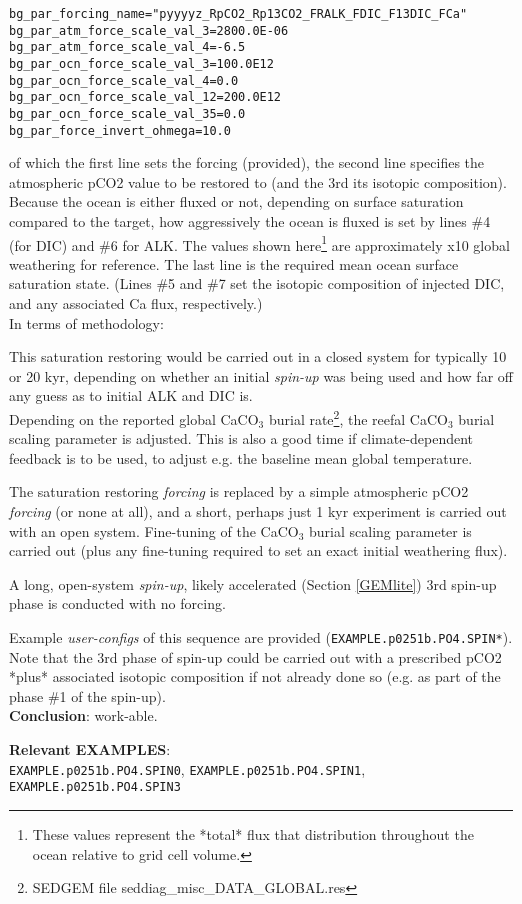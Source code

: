 \documentclass[10pt,twoside]{article}
\begin{document}
\begin{compactenum}
\begin{verbatim}
bg_par_forcing_name="pyyyyz_RpCO2_Rp13CO2_FRALK_FDIC_F13DIC_FCa"
bg_par_atm_force_scale_val_3=2800.0E-06
bg_par_atm_force_scale_val_4=-6.5
bg_par_ocn_force_scale_val_3=100.0E12
bg_par_ocn_force_scale_val_4=0.0
bg_par_ocn_force_scale_val_12=200.0E12
bg_par_ocn_force_scale_val_35=0.0
bg_par_force_invert_ohmega=10.0
\end{verbatim}\normalsize\vspace{-5pt}
of which the first line sets the forcing (provided), the second line specifies the atmospheric pCO2 value to be restored to (and the 3rd its isotopic composition). Because the ocean is either fluxed or not, depending on surface saturation compared to the target, how aggressively the ocean is fluxed is set by lines \#4 (for DIC) and \#6 for ALK. The values shown here\footnote{These values represent the *total* flux that distribution throughout the ocean relative to grid cell volume.} are approximately x10 global weathering for reference. The last line is the required mean ocean surface saturation state. (Lines \#5 and \#7 set the isotopic composition of injected DIC, and any associated Ca flux, respectively.)
\\ In terms of methodology:
\begin{compactenum}
        \item This saturation restoring would be carried out in a closed system for typically 10 or 20 kyr, depending on whether an initial \textit{spin-up} was being used and how far off any guess as to initial ALK and DIC is.
        \\ Depending on the reported global CaCO$_{3}$ burial rate\footnote{SEDGEM file seddiag\_misc\_DATA\_GLOBAL.res}, the reefal CaCO$_{3}$ burial scaling parameter is adjusted. This is also a good time if climate-dependent feedback is to be used, to adjust e.g. the baseline mean global temperature.
        \item The saturation restoring \textit{forcing} is replaced by a simple atmospheric pCO2 \textit{forcing} (or none at all), and a short, perhaps just 1 kyr experiment is carried out with an open system. Fine-tuning of the CaCO$_{3}$ burial scaling parameter is carried out (plus any fine-tuning required to set an exact initial weathering flux).
        \item A long, open-system \textit{spin-up}, likely accelerated (Section \ref{GEMlite}) 3rd spin-up phase is conducted with no forcing.
\end{compactenum}
Example \textit{user-configs} of this sequence are provided (\texttt{EXAMPLE.p0251b.PO4.SPIN*}).
Note that the 3rd phase of spin-up could be carried out with a prescribed pCO2 *plus* associated isotopic composition if not already done so (e.g. as part of the phase \#1 of the spin-up).
\\ \textbf{Conclusion}: work-able.

\textbf{Relevant EXAMPLES}:
\\ \texttt{EXAMPLE.p0251b.PO4.SPIN0}, \texttt{EXAMPLE.p0251b.PO4.SPIN1}, \texttt{EXAMPLE.p0251b.PO4.SPIN3}
        
\end{compactenum}
\end{document}

